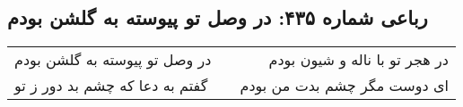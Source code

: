 \begin{center}
\section*{رباعی شماره ۴۳۵: در وصل تو پیوسته به گلشن بودم}
\label{sec:sh435}
\begin{longtable}{l p{0.5cm} r}
در وصل تو پیوسته به گلشن بودم
&&
در هجر تو با ناله و شیون بودم
\\
گفتم به دعا که چشم بد دور ز تو
&&
ای دوست مگر چشم بدت من بودم
\\
\end{longtable}
\end{center}
